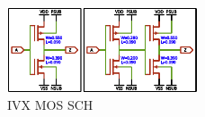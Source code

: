 
\begin{figure}[h]
	\centering
	\includegraphics[width=0.5\textwidth]{./figures/IVX_BUFF_X4_3.pdf}
	\caption{IVX MOS SCH}
	\label{ivxbufmos}
\end{figure}
